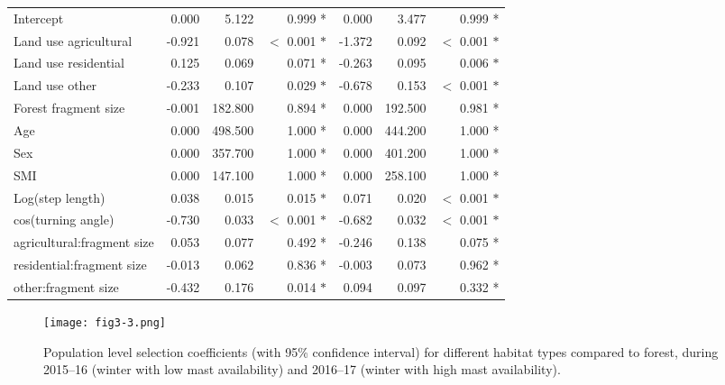 \documentclass[10pt, twoside]{book} %
\begin{document}
\begin{landscape}
\begin{table}
\begin{center}
\begin{footnotesize}
\begin{tabular}{l r r r r r r}
						 Intercept & 0.000 & 5.122 & 0.999 \color{white}*\color{black} & 0.000	& 3.477 & 0.999 \color{white}*\color{black}\\
						 Land use agricultural & -0.921 & 0.078 & $<$ 0.001 $\ast$ & -1.372 & 0.092 & $<$ 0.001 $\ast$\\
						 Land use residential & 0.125 & 0.069 & 0.071 \color{white}*\color{black} & -0.263 & 0.095 & 0.006 $\ast$\\
						 Land use other & -0.233 & 0.107 & 0.029 $\ast$ & -0.678 & 0.153 & $<$ 0.001 $\ast$\\
						 Forest fragment size & -0.001 & 182.800 & 0.894 \color{white}*\color{black} & 0.000 & 192.500 & 0.981 \color{white}*\color{black}\\
						 Age & 0.000 & 498.500 & 1.000 \color{white}*\color{black} & 0.000 & 444.200 & 1.000 \color{white}*\color{black}\\
						 Sex & 0.000 & 357.700 & 1.000 \color{white}*\color{black} & 0.000 & 401.200 & 1.000 \color{white}*\color{black}\\
						 SMI & 0.000 & 147.100 & 1.000 \color{white}*\color{black} & 0.000 & 258.100 & 1.000 \color{white}*\color{black}\\
						 Log(step length) & 0.038 & 0.015 & 0.015 $\ast$ & 0.071 & 0.020 & $<$ 0.001 $\ast$\\
						 cos(turning angle) & -0.730 & 0.033 & $<$ 0.001 $\ast$ & -0.682 & 0.032 & $<$ 0.001 $\ast$\\
						 agricultural:fragment size& 0.053 & 0.077 & 0.492 \color{white}*\color{black}& -0.246 & 0.138 & 0.075 \color{white}*\color{black}\\
						 residential:fragment size & -0.013 & 0.062 & 0.836 \color{white}*\color{black}& -0.003 & 0.073 & 0.962 \color{white}*\color{black}\\
						 other:fragment size & -0.432 & 0.176 & 0.014 $\ast$ & 0.094 & 0.097 & 0.332 \color{white}*\color{black}\\
						
						\bottomrule
					\end{tabular}\endgroup
				\end{footnotesize}
			\end{center}
		\end{table}
	\end{landscape}	

\begin{figure}[t]
	\begin{center}
		\texttt{[image: fig3-3.png]}
	\end{center}
	\caption{Population level selection coefficients (with 95\% confidence interval) for different habitat types compared to forest, during 2015--16 (winter with low mast availability) and 2016--17 (winter with high mast availability).}\label{fig3-3}
\end{figure}
\end{document}
